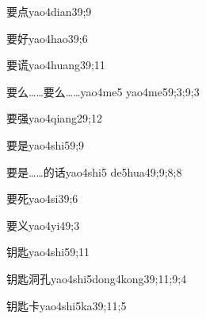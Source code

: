 \begin{verbete}{要点}{yao4dian3}{9;9}
\end{verbete}

\begin{verbete}{要好}{yao4hao3}{9;6}
\end{verbete}

\begin{verbete}{要谎}{yao4huang3}{9;11}
\end{verbete}

\begin{verbete}{要么……要么……}{yao4me5 yao4me5}{9;3;9;3}
\end{verbete}

\begin{verbete}{要强}{yao4qiang2}{9;12}
\end{verbete}

\begin{verbete}{要是}{yao4shi5}{9;9}
\end{verbete}

\begin{verbete}{要是……的话}{yao4shi5 de5hua4}{9;9;8;8}
\end{verbete}

\begin{verbete}{要死}{yao4si3}{9;6}
\end{verbete}

\begin{verbete}{要义}{yao4yi4}{9;3}
\end{verbete}

\begin{verbete}{钥匙}{yao4shi5}{9;11}
\end{verbete}

\begin{verbete}{钥匙洞孔}{yao4shi5dong4kong3}{9;11;9;4}
\end{verbete}

\begin{verbete}{钥匙卡}{yao4shi5ka3}{9;11;5}
\end{verbete}

